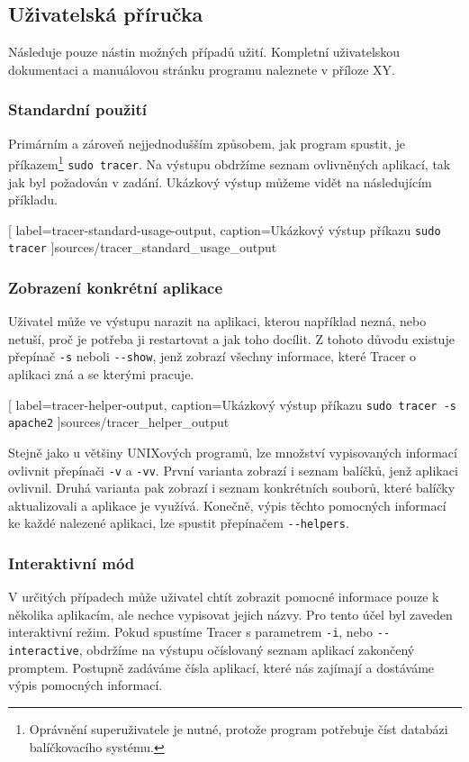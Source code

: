 \documentclass[
  field=inf,
  biblatex,
  glossaries,
  index
]{kidiplom}
\begin{document}
	\subsection{Uživatelská příručka}
		Následuje pouze nástin možných případů užití. Kompletní uživatelskou dokumentaci a manuálovou stránku programu naleznete v příloze XY.

		\subsubsection{Standardní použití}
		Primárním a zároveň nejjednodušším způsobem, jak program spustit, je příkazem\footnote{Oprávnění superuživatele je nutné, protože program potřebuje číst databázi balíčkovacího systému.} \texttt{sudo tracer}. Na výstupu obdržíme seznam ovlivněných aplikací, tak jak byl požadován v zadání. Ukázkový výstup můžeme vidět na následujícím příkladu.

		
		[
			label=tracer-standard-usage-output,
			caption={Ukázkový výstup příkazu \texttt{sudo tracer}}
		]{sources/tracer_standard_usage_output}

		\pagebreak
		\subsubsection{Zobrazení konkrétní aplikace}
		Uživatel může ve výstupu narazit na aplikaci, kterou například nezná, nebo netuší, proč je potřeba ji restartovat a jak toho docílit. Z tohoto důvodu existuje přepínač \texttt{-s} neboli \texttt{-{}-show}, jenž zobrazí všechny informace, které Tracer o aplikaci zná a se kterými pracuje.

		
		[
			label=tracer-helper-output,
			caption={Ukázkový výstup příkazu \texttt{sudo tracer -s apache2}}
		]{sources/tracer_helper_output}

		Stejně jako u většiny UNIXových programů, lze množství vypisovaných informací ovlivnit přepínači \texttt{-v} a \texttt{-vv}. První varianta zobrazí i seznam balíčků, jenž aplikaci ovlivnil. Druhá varianta pak zobrazí i seznam konkrétních souborů, které balíčky aktualizovali a aplikace je využívá. Konečně, výpis těchto pomocných informací ke každé nalezené aplikaci, lze spustit přepínačem \texttt{-{}-helpers}.

		\subsubsection{Interaktivní mód}
		V určitých případech může uživatel chtít zobrazit pomocné informace pouze k několika aplikacím, ale nechce vypisovat jejich názvy. Pro tento účel byl zaveden interaktivní režim. Pokud spustíme Tracer s parametrem \texttt{-i}, nebo \texttt{-{}-interactive}, obdržíme na výstupu očíslovaný seznam aplikací zakončený promptem. Postupně zadáváme čísla aplikací, které nás zajímají a dostáváme výpis pomocných informací.
\end{document}
